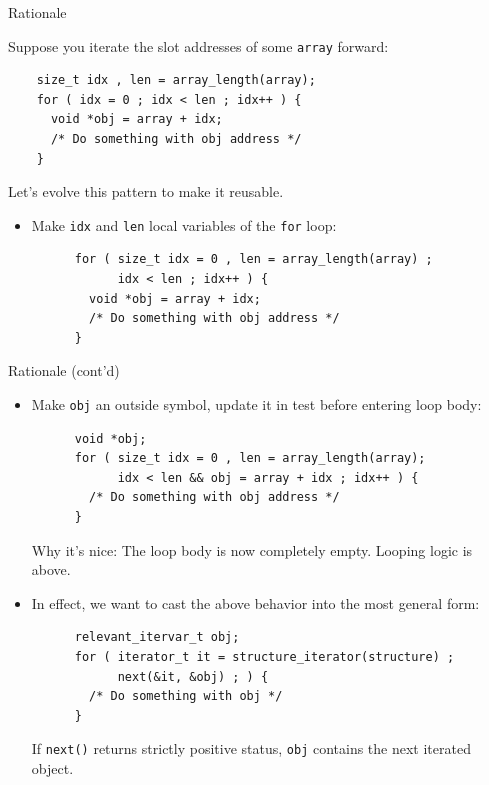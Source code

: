 \begin{frame}[fragile]{Rationale}

  Suppose you iterate the slot addresses of some \lstinline{array} forward:
  \begin{lstlisting}
    size_t idx , len = array_length(array);    
    for ( idx = 0 ; idx < len ; idx++ ) {
      void *obj = array + idx;
      /* Do something with obj address */
    }
  \end{lstlisting}

  Let's evolve this pattern to make it reusable.
  
  \begin{itemize}
  \item Make \lstinline{idx} and \lstinline{len} local variables of the \lstinline{for} loop:
    \begin{lstlisting}
      for ( size_t idx = 0 , len = array_length(array) ;
            idx < len ; idx++ ) {
        void *obj = array + idx;
        /* Do something with obj address */
      }
    \end{lstlisting}
  \end{itemize}

\end{frame}


\begin{frame}[fragile]{Rationale (cont'd)}

  \begin{itemize}
  \item Make \lstinline{obj} an outside symbol, update it in test before entering loop body:
    \begin{lstlisting}
      void *obj;
      for ( size_t idx = 0 , len = array_length(array);
            idx < len && obj = array + idx ; idx++ ) {
        /* Do something with obj address */
      }
    \end{lstlisting}
    Why it's nice: The loop body is now completely empty. Looping logic is above.
  \item In effect, we want to cast the above behavior into the most general form:
    \begin{lstlisting}
      relevant_itervar_t obj;
      for ( iterator_t it = structure_iterator(structure) ;
            next(&it, &obj) ; ) {
        /* Do something with obj */
      }
    \end{lstlisting}
    If \lstinline{next()} returns strictly positive status, \lstinline{obj} contains the next iterated object.
  \end{itemize}

\end{frame}


